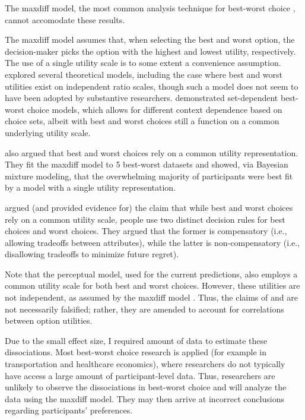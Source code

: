 The maxdiff model, the most common analysis technique for best-worst choice \parencite{marleyProbabilisticModelsBest2005,hawkinsBestTimesWorst2014,muhlbacher2016experimental,de2017relations}, cannot accomodate these results.  

The maxdiff model assumes that, when selecting the best and worst option, the decision-maker picks the option with the highest and lowest utility, respectively. The use of a single utility scale is to some extent a convenience assumption. \textcite{marleyProbabilisticModelsBest2005} explored several theoretical models, including the case where best and worst utilities exist on independent ratio scales, though such a model does not seem to have been adopted by substantive researchers. \textcite{marleyProbabilisticModelsSetdependent2008} demonstrated set-dependent best-worst choice models, which allows for different context dependence based on choice sets, albeit with best and worst choices still a function on a common underlying utility scale. 

\textcite{hawkins2019like} also argued that best and worst choices rely on a common utility representation. They fit the maxdiff model to 5 best-worst datasets and showed, via Bayesian mixture modeling, that the overwhelming majority of participants were best fit by a model with a single utility representation. 

\textcite{gervzinivc2021estimating} argued (and provided evidence for) the claim that while best and worst choices rely on a common utility scale, people use two distinct decision rules for best choices and worst choices. They argued that the former is compensatory (i.e., allowing tradeoffs between attributes), while the latter is non-compensatory (i.e., disallowing tradeoffs to minimize future regret). 

Note that the perceptual model, used for the current predictions, also employs a common utility scale for both best and worst choices. However, these utilities are not independent, as assumed by the maxdiff model \parencite{de2017relations}. Thus, the claims of \textcite{hawkinsBestTimesWorst2014} and \textcite{hawkins2019like} are not necessarily falsified; rather, they are amended to account for correlations between option utilities.

Due to the small effect size, I required amount of data to estimate these dissociations. Most best-worst choice research is applied (for example in transportation and healthcare economics), where researchers do not typically have access a large amount of participant-level data. Thus, researchers are unlikely to observe the dissociations in best-worst choice and will analyze the data using the maxdiff model. They may then arrive at incorrect conclusions regarding participants' preferences. 

